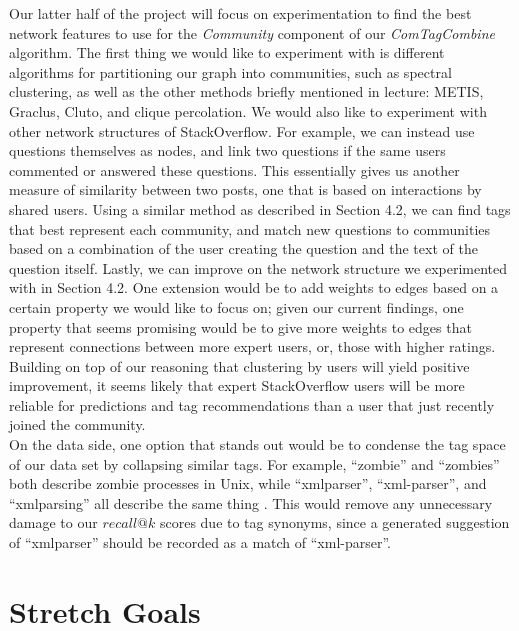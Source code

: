 \documentclass[10pt, final]{article}
\newcommand{\br}[1][.75]{\ \\[#1\baselineskip]}
\begin{document}
Our latter half of the project will focus on experimentation to find the best network features to use for the \textit{Community} component of our \textit{ComTagCombine} algorithm. The first thing we would like to experiment with is different algorithms for partitioning our graph into communities, such as spectral clustering, as well as the other methods briefly mentioned in lecture: METIS, Graclus, Cluto, and clique percolation. We would also like to experiment with other network structures of StackOverflow. For example, we can instead use questions themselves as nodes, and link two questions if the same users commented or answered these questions. This essentially gives us another measure of similarity between two posts, one that is based on interactions by shared users. Using a similar method as described in Section 4.2, we can find tags that best represent each community, and match new questions to communities based on a combination of the user creating the question and the text of the question itself. Lastly, we can improve on the network structure we experimented with in Section 4.2. One extension would be to add weights to edges based on a certain property we would like to focus on; given our current findings, one property that seems promising would be to give more weights to edges that represent connections between more expert users, or, those with higher ratings. Building on top of our reasoning that clustering by users will yield positive improvement, it seems likely that expert StackOverflow users will be more reliable for predictions and tag recommendations than a user that just recently joined the community.\br
On the data side, one option that stands out would be to condense the tag space of our data set by collapsing similar tags. For example, ``zombie'' and ``zombies'' both describe zombie processes in Unix, while ``xmlparser'', ``xml-parser'', and ``xmlparsing'' all describe the same thing \cite{1}. This would remove any unnecessary damage to our $recall@k$ scores due to tag synonyms, since a generated suggestion of ``xmlparser'' should be recorded as a match of ``xml-parser''.

\section{Stretch Goals}
\end{document}

